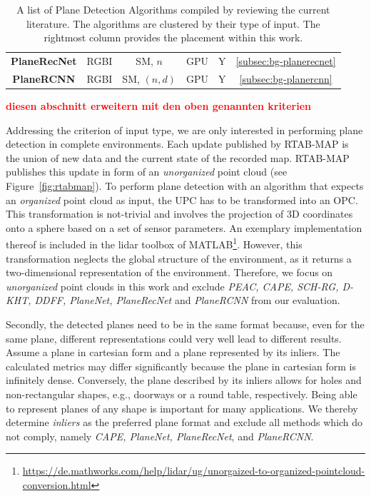 \documentclass[main.tex]{subfiles}
\begin{document}
\begin{table}[H]
{\begin{tabular}{c|c|c|c|c|c}
            \textbf{PlaneRecNet} \cite{Xie_Shu_Rambach_Pagani_Stricker_2022} & RGBI                & SM, $n$               & GPU               & Y                  & \ref{subsec:bg-planerecnet} \\
            \textbf{PlaneRCNN} \cite{Liu_Kim_Gu_Furukawa_Kautz_2019}         & RGBI                & SM, $(n, d)$          & GPU               & Y                  & \ref{subsec:bg-planercnn}   \\
        \end{tabular}
    }
    \caption{A list of Plane Detection Algorithms compiled by reviewing the current literature. The algorithms are clustered by their type of input.
        The rightmost column provides the placement within this work.}
    \label{tab:algos}
\end{table}

\textbf{\textcolor{red}{diesen abschnitt erweitern mit den oben genannten kriterien}}

Addressing the criterion of input type, we are only interested in performing plane detection in complete environments.
Each update published by RTAB-MAP is the union of new data and the current state of the recorded map. RTAB-MAP publishes this update
in form of an \textit{unorganized} point cloud (see Figure~\ref{fig:rtabmap}).
To perform plane detection with an algorithm that expects an \textit{organized} point cloud as input, the UPC has to be transformed into an OPC.
This transformation is not-trivial and involves the projection of 3D coordinates onto a sphere based on a set of sensor parameters.
An exemplary implementation thereof is included in the lidar toolbox of MATLAB\footnote{\href{https://de.mathworks.com/help/lidar/ug/unorgaized-to-organized-pointcloud-conversion.html}{https://de.mathworks.com/help/lidar/ug/unorgaized-to-organized-pointcloud-conversion.html}}.
However, this transformation neglects the global structure of the environment, as it returns a two-dimensional representation of the environment.
Therefore, we focus on \textit{unorganized} point clouds in this work and exclude \textit{PEAC, CAPE, SCH-RG, D-KHT, DDFF, PlaneNet, PlaneRecNet} and \textit{PlaneRCNN} from our evaluation.

Secondly, the detected planes need to be in the same format because, even for the same plane, different representations could very well lead to different results.
Assume a plane in cartesian form and a plane represented by its inliers. The calculated metrics may differ significantly because the plane in cartesian form is infinitely dense.
Conversely, the plane described by its inliers allows for holes and non-rectangular shapes, e.g., doorways or a round table, respectively.
Being able to represent planes of any shape is important for many applications.
We thereby determine \textit{inliers} as the preferred plane format and exclude all methods which do not comply, namely \textit{CAPE, PlaneNet, PlaneRecNet}, and \textit{PlaneRCNN}.
\end{document}
